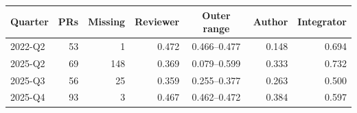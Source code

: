\begin{tabular}{lrrrcrr}
\toprule
Quarter & PRs & Missing & Reviewer & Outer range & Author & Integrator \\
\midrule
2022-Q2 & 53 & 1 & 0.472 & 0.466--0.477 & 0.148 & 0.694 \\
2025-Q2 & 69 & 148 & 0.369 & 0.079--0.599 & 0.333 & 0.732 \\
2025-Q3 & 56 & 25 & 0.359 & 0.255--0.377 & 0.263 & 0.500 \\
2025-Q4 & 93 & 3 & 0.467 & 0.462--0.472 & 0.384 & 0.597 \\
\bottomrule
\end{tabular}
